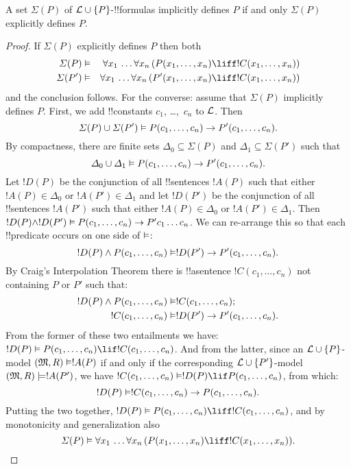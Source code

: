 \documentclass[../../../include/open-logic-section]{subfiles}
\begin{document}
\begin{thm} A set $\Sigma(P)$ of $\Lang{L}
  \cup\{P\}$-!!{formula}s implicitly defines $P$ if and only $\Sigma(P)$
  explicitly defines $P$.
\end{thm}

\begin{proof}
If $\Sigma(P)$ explicitly defines $P$ then both
\begin{align*}
  \Sigma(P) & \Entails & \lforall[x_1][\dots \lforall[x_n]
    [(\Atom{P}{x_1,\dots, x_n} \liff !C(x_1,\dots,x_n))]]\\
  \Sigma(P') & \Entails & \lforall[x_1][\dots \lforall[x_n]
    [(\Atom{P'}{x_1,\dots, x_n} \liff !C(x_1,\dots,x_n))]]
\end{align*}
and the conclusion follows. For the converse: assume that $\Sigma(P)$
implicitly defines $P$. First, we add !!{constant}s $c_1$, \dots,~$c_n$ to
$\Lang{L}$. Then
\[
\Sigma(P) \cup \Sigma(P') \Entails
\Atom{P}{c_1, \dots, c_n} \to  \Atom{P'}{c_1, \dots, c_n}.
\]
By compactness, there are finite sets $\Delta_0 \subseteq \Sigma(P)$
and $\Delta_1 \subseteq \Sigma(P')$ such that
\[
\Delta_0 \cup \Delta_1 \Entails
\Atom{P}{c_1, \dots, c_n} \to \Atom{P'}{c_1, \dots, c_n}.
\]
Let $!D(P)$ be the conjunction of all !!{sentence}s $!A(P)$ such that
either $!A(P) \in \Delta_0$ or $!A(P') \in \Delta_1$ and let $!D(P')$
be the conjunction of all !!{sentence}s $!A(P')$ such that either
$!A(P) \in \Delta_0$ or $!A(P') \in \Delta_1$. Then $!D(P) \land
!D(P') \Entails \Atom{P}{c_1, \dots, c_n} \to P'c_1\dots c_n$. We can
re-arrange this so that each !!{predicate} occurs on one side of
$\Entails$:
\[
!D(P) \land \Atom{P}{c_1, \dots, c_n} \Entails
!D(P') \to \Atom{P'}{c_1, \dots, c_n}.
\]
By Craig's Interpolation Theorem there is !!a{sentence} $!C(c_1,\dots, c_n)$
not containing $P$ or $P'$ such that:
\begin{align*}
  !D(P) \land \Atom{P}{c_1, \dots, c_n} & \Entails !C(c_1,\dots, c_n); \\
  !C(c_1,\dots, c_n) & \Entails !D(P') \to \Atom{P'}{c_1, \dots, c_n}.
\end{align*}
From the former of these two entailments we have: $!D(P) \Entails
\Atom{P}{c_1,\dots, c_n} \lif !C(c_1,\dots, c_n)$. And from the
latter, since an $\Lang{L} \cup \{P\}$-model $\Expan{M}{R}
\Entails !A(P)$ if and only if the corresponding $\Lang{L} \cup
\{P'\}$-model $\Expan{M}{R} \models !A(P')$, we have
$!C(c_1,\dots, c_n) \Entails !D(P) \lif \Atom{P}{c_1,\dots, c_n}$,
from which:
\[
!D(P) \Entails !C(c_1,\dots,c_n) \to \Atom{P}{c_1,\dots, c_n}.
\]
Putting the two together, $!D(P) \Entails \Atom{P}{c_1,\dots, c_n}
\liff !C(c_1, \dots, c_n)$, and by monotonicity and generalization also
\[
\Sigma(P) \Entails
\lforall[x_1][\dots\lforall[x_n][(\Atom{P}{x_1,\dots, x_n} \liff
    !C(x_1,\dots, x_n))]].
\]
\end{proof}
\end{document}
